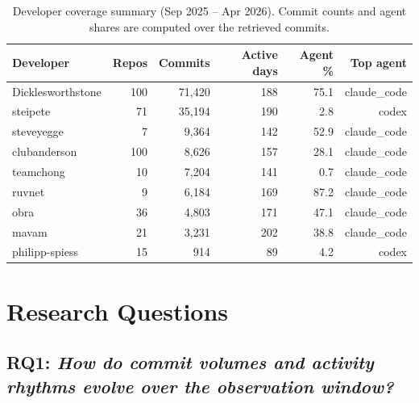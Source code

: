 \documentclass[smallextended]{svjour3}
\begin{document}
\begin{table}[tbp]
\caption{Developer coverage summary (Sep 2025 -- Apr 2026). Commit counts and agent shares are computed over the retrieved commits.}
\label{tab:devs}
\centering
\begin{tabular}{lrrrrr}
\toprule
Developer & Repos & Commits & Active days & Agent \% & Top agent \\
\midrule
Dicklesworthstone & 100 & 71,420 & 188 & 75.1 & claude\_code \\
steipete          &  71 & 35,194 & 190 &  2.8 & codex \\
steveyegge        &   7 &  9,364 & 142 & 52.9 & claude\_code \\
clubanderson      & 100 &  8,626 & 157 & 28.1 & claude\_code \\
teamchong         &  10 &  7,204 & 141 &  0.7 & claude\_code \\
ruvnet            &   9 &  6,184 & 169 & 87.2 & claude\_code \\
obra              &  36 &  4,803 & 171 & 47.1 & claude\_code \\
mavam             &  21 &  3,231 & 202 & 38.8 & claude\_code \\
philipp-spiess    &  15 &    914 &  89 &  4.2 & codex \\
\bottomrule
\end{tabular}
\end{table}



\section{Research Questions}
\label{sec:rqs}

\subsection*{RQ1: \emph{How do commit volumes and activity rhythms evolve over the observation window?}}
\end{document}
